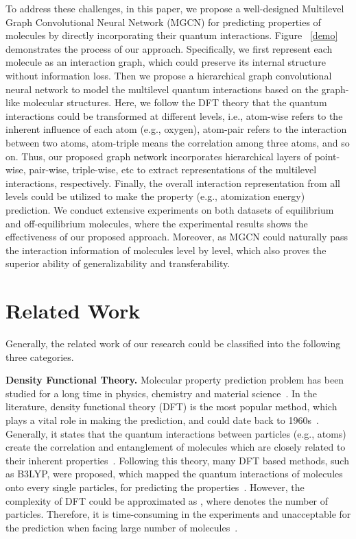 \documentclass[letterpaper]{article} \usepackage{bm}
\begin{document}
To address these challenges, in this paper, we propose a well-designed Multilevel Graph Convolutional Neural Network (MGCN) for predicting properties of molecules by directly incorporating their quantum interactions. Figure ~\ref{demo} demonstrates the process of our approach. Specifically, we first represent each molecule as an interaction graph, which could preserve its internal structure without information loss. Then we propose a hierarchical graph convolutional neural network to model the multilevel quantum interactions based on the graph-like molecular structures. Here, we follow  the DFT theory that the quantum interactions could be transformed at different levels, i.e., atom-wise refers to the inherent influence of each atom (e.g., oxygen), atom-pair refers to the interaction between two atoms, atom-triple means the correlation among three atoms, and so on. Thus, our proposed graph network incorporates hierarchical layers of point-wise, pair-wise, triple-wise, etc to extract representations of the multilevel interactions, respectively. Finally, the overall interaction representation from all levels could be utilized to make the property (e.g., atomization energy) prediction. We conduct extensive experiments on both datasets of equilibrium and off-equilibrium molecules, where the experimental results shows the effectiveness of our proposed approach. Moreover, as MGCN could naturally pass the interaction information of molecules level by level, which also proves the superior ability of generalizability and transferability.


\section{Related Work}
Generally, the related work of our research could be classified into the following three categories.

\textbf{Density Functional Theory.}
Molecular property prediction problem has been studied for a long time in physics, chemistry and material science~\cite{wang2011application}. In the literature, density functional theory (DFT) is the most popular method, which plays a vital role in making the prediction, and could date back to 1960s~\cite{hohenberg1964inhomogeneous,kohn1965self,lawless2002information}. Generally, it states that the quantum interactions between particles (e.g., atoms) create the correlation and entanglement of molecules which are closely related to their inherent properties~\cite{thouless2014quantum}. Following this theory, many DFT based methods, such as B3LYP, were proposed, which mapped the quantum interactions of molecules onto every single particles, for predicting the properties~\cite{yanai2004new}. However, the complexity of DFT could be approximated as , where  denotes the number of particles. Therefore, it is time-consuming in the experiments and unacceptable for the prediction when facing large number of molecules~\cite{Gilmer2017NeuralMP}.
\end{document}
